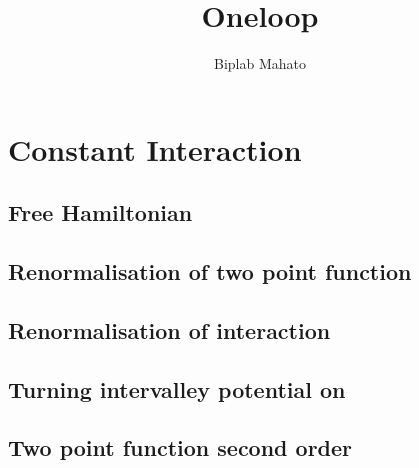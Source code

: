 \documentclass[a4paper]{article}
\title{
	Oneloop
}
\author{Biplab Mahato}
\begin{document}
    
    \tableofcontents
    
    \section{Constant Interaction}
    \subsection{Free Hamiltonian}
        
    \subsection{Renormalisation of two point function}
        
    \subsection{Renormalisation of interaction}
        
    \subsection{Turning intervalley potential on}
        
    \subsection{Two point function second order}
        
\end{document}
